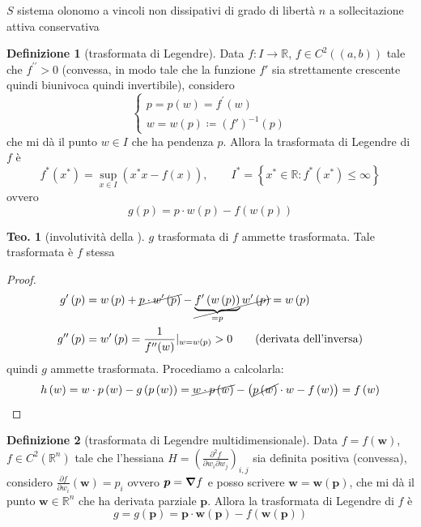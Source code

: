 \documentclass[a4paper,10pt]{article}
\theoremstyle{definition}
\newcommand{\bv}{\boldsymbol} %
\newcommand{\re}{\mathbb{R}} %
\theoremstyle{indentdefinition}
\newtheorem{defn}{Definizione}[section]
\theoremstyle{indenttheorem}
\newtheorem{thm}{Teo.}
\theoremstyle{myremark}
\theoremstyle{indentgeneral}
\begin{document}
$S$ sistema olonomo a vincoli non dissipativi di grado di libertà
$n$ a sollecitazione attiva conservativa
\begin{defn}[trasformata di Legendre]
\label{def:trasformata-legendre}Data $f:I\to\re$, $f\in C^{2}\left(\left(a,b\right)\right)$
tale che $f^{\prime\prime}>0$ (convessa, in modo tale che la funzione $f'$ sia strettamente crescente quindi biunivoca quindi invertibile), considero $$\begin{cases}
   p=p(w)= f^{\prime}\left(w\right) \\
 w=w\left(p\right)\coloneqq (f')^{-1}(p)
\end{cases}$$ che mi dà il punto $w\in I$ che ha pendenza $p$. Allora la trasformata di Legendre
di $f$ è
$$f^{*}(x^{*})=\sup_{x\in I}(x^{*}x-f(x)),\qquad I^{*}=\left\{x^{*}\in \mathbb {R} :f^{*}(x^{*})\le\infty \right\}$$
ovvero 
\[
g\left(p\right)=p\cdot w\left(p\right)-f\left(w\left(p\right)\right)
\]
\end{defn}

\begin{thm}[involutività della ]
\label{thm:involutivita-trasformata-legendre}$g$ trasformata di
$f$ ammette trasformata. Tale trasformata è $f$ stessa
\end{thm}

\begin{proof}
\begin{align}
g'\left(p\right) &=w\left(p\right)+\cancel{p\cdot w^{\prime}\left(p\right)}-\cancel{\underbrace{f^{\prime}\left(w\left(p\right)\right)}_{=p}w^{\prime}\left(p\right)}=w\left(p\right) \\
g^{\prime\prime}\left(p\right) &=w^{\prime}\left(p\right)=\frac{1}{f^{\prime\prime}(w)}|_{w=w\left(p\right)}>0 \qquad\text{(derivata dell'inversa)}\label{eq:derivate-trasformata-legendre}
\end{align}
quindi $g$ ammette trasformata. Procediamo a calcolarla:
\[
h\left(w\right)=w\cdot p\left(w\right)-g\left(p\left(w\right)\right)=\cancel{w\cdot p\left(w\right)}-\left(\cancel{p\left(w\right)}\cdot w-f\left(w\right)\right)=f\left(w\right)
\]
\end{proof}
\begin{defn}[trasformata di Legendre multidimensionale]
\label{def:trasformata-legendre-multidimensionale}Data $f=f\left(\bv{w}\right)$,
$f\in C^{2}\left(\mathbb{R}^{n}\right)$ tale che l'hessiana $H=\left(\frac{\partial^{2}f}{\partial w_{i}\partial w_{j}}\right)_{i,j}$ sia
definita positiva (convessa), considero $\frac{\partial f}{\partial w_{i}}\left(\bv{w}\right)=p_{i}$ ovvero $\bv{p}=\grad f$ 
e posso scrivere $\bv{w}=\bv{w}\left(\bv{p}\right)$, che mi dà il punto $\bv{w}\in\re^n$ che ha derivata  parziale $\bv{p}$. Allora la trasformata di Legendre
di $f$ è
\[
g=g\left(\bv{p}\right)=\bv{p}\cdot \bv{w}\left(\bv{
p}\right)-f\left(\bv{w}\left(\bv{p}\right)\right)
\]
\end{defn}
\end{document}
